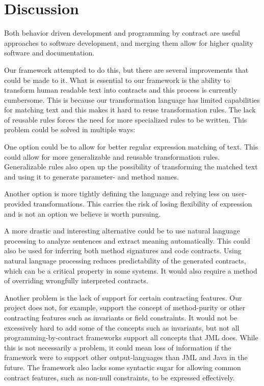 \section{Discussion}
Both behavior driven development and programming by contract are useful approaches to software development, and merging them allow for higher quality software and documentation.

Our framework attempted to do this, but there are several improvements that could be made to it.
What is essential to our framework is the ability to transform human readable text into contracts and this process is currently cumbersome.
This is because our transformation language has limited capabilities for matching text and this makes it hard to reuse transformation rules.
The lack of reusable rules forces the need for more specialized rules to be written.
This problem could be solved in multiple ways: 

One option could be to allow for better regular expression matching of text.
This could allow for more generalizable and reusable transformation rules.
Generalizable rules also open up the possibility of transforming the matched text and using it to generate parameter- and method names.

Another option is more tightly defining the language and relying less on user-provided transformations.
This carries the risk of losing flexibility of expression and is not an option we believe is worth pursuing.

A more drastic and interesting alternative could be to use natural language processing \cite{jurafsky2002speech} to analyze sentences and extract meaning automatically.
This could also be used for inferring both method signatures and code contracts.
Using natural language processing reduces predictability of the generated contracts, which can be a critical property in some systems.
It would also require a method of overriding wrongfully interpreted contracts.

Another problem is the lack of support for certain contracting features.
Our project does not, for example, support the concept of method-purity or other contracting features such as invariants or field constraints.
It would not be excessively hard to add some of the concepts such as invariants, but not all programming-by-contract frameworks support all concepts that JML does.
While this is not necessarily a problem, it could mean loss of information if the framework were to support other output-languages than JML and Java in the future.
The framework also lacks some syntactic sugar for allowing common contract features, such as non-null constraints, to be expressed effectively.

